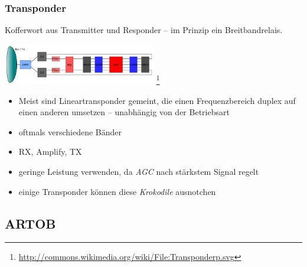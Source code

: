 \begin{frame}
    \frametitle{Transponder}

    Kofferwort aus Transmitter und Responder -- im Prinzip ein Breitbandrelais.

    \begin{center}
        \includegraphics[width=0.5\textwidth,height=.3\textheight,keepaspectratio]{bv11/Transponder.png}
        \footnote{\tiny \url{http://commons.wikimedia.org/wiki/File:Transponderp.svg}}
    \end{center}

    \begin{itemize}
        \item Meist sind Lineartransponder gemeint, die einen Frequenzbereich
              duplex auf einen anderen umsetzen -- unabhängig von der Betriebsart
        \item oftmals verschiedene Bänder
        \item RX, Amplify, TX
        \item geringe Leistung verwenden, da \emph{AGC} nach stärkstem Signal regelt
        \item einige Transponder können diese \emph{Krokodile} ausnotchen
    \end{itemize}

\end{frame}

\subsection{ARTOB}

